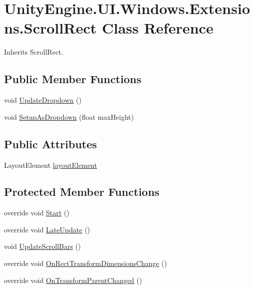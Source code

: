 \hypertarget{class_unity_engine_1_1_u_i_1_1_windows_1_1_extensions_1_1_scroll_rect}{}\section{Unity\+Engine.\+U\+I.\+Windows.\+Extensions.\+Scroll\+Rect Class Reference}
\label{class_unity_engine_1_1_u_i_1_1_windows_1_1_extensions_1_1_scroll_rect}


Inherits Scroll\+Rect.

\subsection*{Public Member Functions}
\begin{DoxyCompactItemize}
\item 
void \hyperlink{class_unity_engine_1_1_u_i_1_1_windows_1_1_extensions_1_1_scroll_rect_af5e6a797c71cc55dd4f5b9dbea5f01fb}{Update\+Dropdown} ()
\item 
void \hyperlink{class_unity_engine_1_1_u_i_1_1_windows_1_1_extensions_1_1_scroll_rect_a2e822d299718e87e2784bcde42eb1502}{Setup\+As\+Dropdown} (float max\+Height)
\end{DoxyCompactItemize}
\subsection*{Public Attributes}
\begin{DoxyCompactItemize}
\item 
Layout\+Element \hyperlink{class_unity_engine_1_1_u_i_1_1_windows_1_1_extensions_1_1_scroll_rect_a80bf45da87d2f9f5236f17c7c20fc75b}{layout\+Element}
\end{DoxyCompactItemize}
\subsection*{Protected Member Functions}
\begin{DoxyCompactItemize}
\item 
override void \hyperlink{class_unity_engine_1_1_u_i_1_1_windows_1_1_extensions_1_1_scroll_rect_ae99f69e7926ccb854b74735862c5b95b}{Start} ()
\item 
override void \hyperlink{class_unity_engine_1_1_u_i_1_1_windows_1_1_extensions_1_1_scroll_rect_ae19b23f6b7db3c5c09c3ee4644b99529}{Late\+Update} ()
\item 
void \hyperlink{class_unity_engine_1_1_u_i_1_1_windows_1_1_extensions_1_1_scroll_rect_abb9be960c1ce63f61c7f152e8a080d69}{Update\+Scroll\+Bars} ()
\item 
override void \hyperlink{class_unity_engine_1_1_u_i_1_1_windows_1_1_extensions_1_1_scroll_rect_a90bc47640417d812e84bbf478639c9ca}{On\+Rect\+Transform\+Dimensions\+Change} ()
\item 
override void \hyperlink{class_unity_engine_1_1_u_i_1_1_windows_1_1_extensions_1_1_scroll_rect_a6cf4f3ed6b5d5b8b3672c7fcf34e23bd}{On\+Transform\+Parent\+Changed} ()
\end{DoxyCompactItemize}



